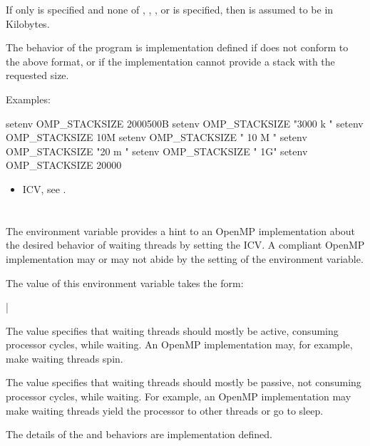 If only  is specified and none of , , , or 
is specified, then  is assumed to be in Kilobytes.

The behavior of the program is implementation defined if  does not
conform to the above format, or if the implementation cannot provide a stack with the
requested size.

Examples:
\begin{ompEnv}
setenv OMP_STACKSIZE 2000500B
setenv OMP_STACKSIZE "3000 k "
setenv OMP_STACKSIZE 10M
setenv OMP_STACKSIZE " 10 M "
setenv OMP_STACKSIZE "20 m "
setenv OMP_STACKSIZE " 1G"
setenv OMP_STACKSIZE 20000
\end{ompEnv}

\crossreferences
\begin{itemize}
\item {} ICV, see .
\end{itemize}









\section{}
\label{sec:OMP_WAIT_POLICY}
The  environment variable provides a hint to an OpenMP
implementation about the desired behavior of waiting threads by setting the
 ICV. A compliant OpenMP implementation may or may not abide by the setting of
the environment variable.

The value of this environment variable takes the form:

{|}

The  value specifies that waiting threads should mostly be active, consuming
processor cycles, while waiting. An OpenMP implementation may, for example, make
waiting threads spin.

The  value specifies that waiting threads should mostly be passive, not
consuming processor cycles, while waiting. For example, an OpenMP implementation
may make waiting threads yield the processor to other threads or go to sleep.

The details of the  and  behaviors are implementation defined.

